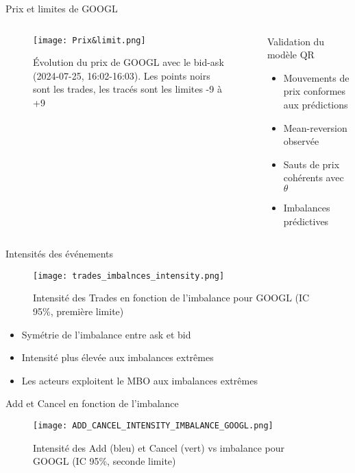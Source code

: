 \documentclass[aspectratio=169]{beamer}  %
\begin{document}
\begin{frame}{Prix et limites de GOOGL}
    \begin{columns}
        \begin{column}{0.7\textwidth}
            \begin{figure}
                \centering
                \texttt{[image: Prix\&limit.png]}
                \caption{Évolution du prix de GOOGL avec le bid-ask (2024-07-25, 16:02-16:03). Les points noirs sont les trades, les tracés sont les limites -9 à +9}
            \end{figure}
        \end{column}
        \begin{column}{0.3\textwidth}
            \begin{alertblock}{Validation du modèle QR}
                \begin{itemize}
                    \item Mouvements de prix conformes aux prédictions
                    \item Mean-reversion observée
                    \item Sauts de prix cohérents avec $\theta$
                    \item Imbalances prédictives
                \end{itemize}
            \end{alertblock}
        \end{column}
    \end{columns}
\end{frame}

\begin{frame}{Intensités des événements}
    \begin{figure}
        \centering
        \texttt{[image: trades\_imbalnces\_intensity.png]}
        \caption{Intensité des Trades en fonction de l'imbalance pour GOOGL (IC 95\%, première limite)}
    \end{figure}
    \begin{itemize}
        \item Symétrie de l'imbalance entre ask et bid
        \item Intensité plus élevée aux imbalances extrêmes
        \item Les acteurs exploitent le MBO aux imbalances extrêmes
    \end{itemize}
\end{frame}

\begin{frame}{Add et Cancel en fonction de l'imbalance}
    \begin{figure}
        \centering
        \texttt{[image: ADD\_CANCEL\_INTENSITY\_IMBALANCE\_GOOGL.png]}
        \caption{Intensité des Add (bleu) et Cancel (vert) vs imbalance pour GOOGL (IC 95\%, seconde limite)}
    \end{figure}
\end{frame}
\end{document}
